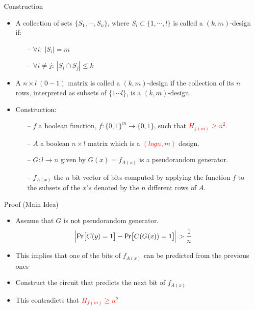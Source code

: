 \documentclass[xcolor={table,dvipsnames,usenames}]{beamer}
\begin{document}
\begin{frame}{Construction}
\begin{itemize}
	\item A collection of sets $\{S_1, \cdots, S_n\}$, where $S_i \subset \{1, \cdots ,l\}$ is called a $(k,m)$-design if:
	\begin{itemize}
		\item[--] $\forall i:~|S_i| = m$
		\item[--] $\forall i \neq j:~|S_i \cap S_j| \leq k$
	\end{itemize}
	\pause
	\item A $n \times l~(0-1)$ matrix is called a $(k,m)$-design if the collection of its $n$ rows, interpreted as subsets of $\{1 \cdots l\}$, is a $(k,m)$-design.
	\pause
	\item Construction:
	\pause
	\begin{itemize}
		\item[--] $f$ a boolean function, $f:\{0, 1\}^m \rightarrow \{0, 1\}$, such that \textcolor{red}{$H_{f(m)} \ge n^2$}.
		\pause
		\item[--] $A$ a boolean $n \times l$ matrix which is a \textcolor{red}{$(logn,m)$} design.
		\pause
		\item[--] $G:l \rightarrow n$ given by $G(x) = f_{A(x)}$ is a pseudorandom generator.
		\pause
		\item[--] $f_{A(x)}$ the $n$ bit vector of bits computed by applying the function $f$ to the subsets of the $x's$ denoted by the $n$ different rows of $A$.
	\end{itemize}
\end{itemize}
\end{frame}
\begin{frame}{Proof (Main Idea)}
\begin{itemize}
	\item Assume that $G$ is not pseudorandom generator.
	$$ \Big|\mathsf{Pr}\big[C(y)=1\big] - \mathsf{Pr}\big[C(G (x))=1\big]\Big| > \frac{1}{n}$$
	\pause
	\item This implies that one of the bits of $f_{A(x)}$ can be predicted from the previous ones
	\pause 
	\item Construct the circuit that predicts the next bit of $f_{A(x)}$
	\pause
	\item This contradicts that  \textcolor{red}{$H_{f(m)} \ge n^2$}
\end{itemize}
\end{frame}
\end{document}
